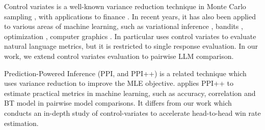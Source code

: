 Control variates is a well-known variance reduction technique in Monte Carlo sampling \citep{mcbook}, with applications to finance \citep{broadie1998risk,hesterberg1998control,kemna1990pricing,glasserman2004monte}. In recent years, it has also been applied to various areas of machine learning, such as variational inference \citep{geffner2018using}, bandits \citep{verma2021stochastic}, optimization \citep{yuan2024mars}, computer graphics \citep{rousselle2016image, muller2020neural}. 
In particular \citep{chaganty2018price} uses control variates to evaluate natural language metrics, but it is restricted to single response evaluation. In our work, we extend control variates evaluation to pairwise LLM comparison.

Prediction-Powered Inference (PPI, and PPI++) \citep{angelopoulos2023prediction, angelopoulos2023ppi++, boyeau2024autoeval} is a related technique which uses variance reduction  to improve the MLE objective.  \cite{boyeau2024autoeval} applies PPI++ to estimate practical metrics in machine learning, such as accuracy, correlation and BT model \citep{bradley1952rank} in pairwise model comparisons. It differs from our work which conducts an in-depth study of control-variates to accelerate head-to-head win rate estimation.